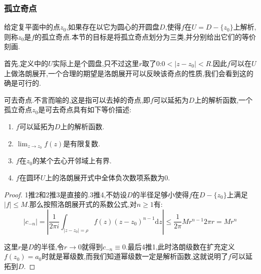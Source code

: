 \subsubsection{孤立奇点}

给定复平面中的点$z_0$,如果存在以它为圆心的开圆盘$D$,使得$f$在$U=D-\{z_0\}$上解析,则称$z_0$是$f$的孤立奇点.本节的目标是将孤立奇点划分为三类,并分别给出它们的等价刻画.

首先,定义中的$U$实际上是个圆盘,只不过这里$r$取了0:$0<|z-z_0|<R$.因此$f$可以在$U$上做洛朗展开,一个合理的期望是洛朗展开可以反映该奇点的性质,我们会看到这的确是可行的.

可去奇点.不言而喻的,这是指可以去掉的奇点,即$f$可以延拓为$D$上的解析函数,一个孤立奇点$z_0$是可去奇点具有如下等价描述:
\begin{enumerate}
	\item $f$可以延拓为$D$上的解析函数.
	\item $\lim_{z\to z_0}f(z)$是有限复数.
	\item $f$在$z_0$的某个去心开邻域上有界.
	\item $f$在圆环$U$上的洛朗展开式中全体负次数项系数为0.
\end{enumerate}
\begin{proof}
	
	1推2和2推3是直接的.3推4,不妨设$D$的半径足够小使得$f$在$D-\{z_0\}$上满足$|f|\le M$.那么按照洛朗展开式的系数公式,对$n\ge1$有:
	$$|c_{-n}|=\left|\frac{1}{2\pi i}\int_{|z-z_0|=\rho}f(z)(z-z_0)^{n-1}\mathrm{d}z\right|\le\frac{1}{2\pi}Mr^{n-1}2\pi r=Mr^n$$
	
	这里$r$是$D$的半径,令$r\to0$就得到$c_{-n}\equiv0$.最后4推1,此时洛朗级数在扩充定义$f(z_0)=a_0$时就是幂级数,而我们知道幂级数一定是解析函数,这就说明了$f$可以延拓到$D$.
\end{proof}

